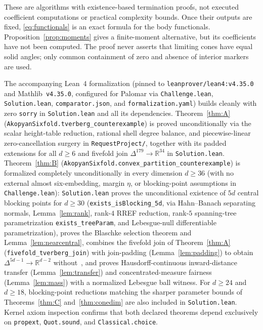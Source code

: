\documentclass[a4paper,11pt,reqno]{amsart}
\newcommand{\R}{\mathbb R}
\theoremstyle{definition}
\theoremstyle{remark}
\numberwithin{equation}{section}
\begin{document}
These are algorithms with existence-based termination proofs, not
executed coefficient computations or practical complexity bounds.
Once their outputs are fixed, \eqref{eq:functionals} is an exact formula
for the body functionals. Proposition~\ref{prop:moments} gives a
finite-moment alternative, but its coefficients have not been computed.
The proof never asserts that limiting cones have equal solid angles;
only common containment of zero and absence of interior markers are used.

\begin{sloppypar}
The accompanying Lean~4 formalization (pinned to \texttt{leanprover/lean4:v4.35.0}
and Mathlib~\texttt{v4.35.0}, configured for Palomar via
\texttt{Challenge.lean}, \texttt{Solution.lean}, \texttt{comparator.json},
and \texttt{formalization.yaml}) builds cleanly with zero \texttt{sorry}
in \texttt{Solution.lean} and all its dependencies.
Theorem~\ref{thm:A} (\texttt{AkopyanSixfold.\allowbreak tverberg\_\allowbreak counterexample})
is proved unconditionally via the scalar height-table reduction, rational shell
degree balance, and piecewise-linear zero-cancellation surgery in
\texttt{RequestProject/}, together with its padded extensions for all $d\ge6$
and fivefold join $\Delta^{179}\to\R^{34}$ in \texttt{Solution.lean}.
Theorem~\ref{thm:B}
(\texttt{AkopyanSixfold.\allowbreak convex\_\allowbreak partition\_\allowbreak counterexample})
is formalized completely unconditionally in every dimension $d\ge36$ (with no
external almost six-embedding, margin $\eta$, or blocking-point assumptions in
\texttt{Challenge.lean}): \texttt{Solution.lean} proves the unconditional
existence of $5d$ central blocking points for $d\ge30$
(\texttt{exists\_isBlocking\_5d}, via Hahn--Banach separating normals,
Lemma~\ref{lem:rank}, rank-$4$ RREF reduction, rank-$5$ spanning-tree
parametrization \texttt{exists\_treeParam}, and Lebesgue-null differentiable
parametrization), proves the Blaschke selection theorem and Lemma~\ref{lem:nearcentral},
combines the fivefold join of Theorem~\ref{thm:A} (\texttt{fivefold\_tverberg\_join})
with join-padding (Lemma~\ref{lem:padding}) to obtain
$\Delta^{5d-1}\to\R^{d-2}$ without~\cite{AKS}, and proves
Hausdorff-continuous inward-distance transfer (Lemma~\ref{lem:transfer}) and
concentrated-measure fairness (Lemma~\ref{lem:mass}) with a normalized
Lebesgue ball witness. For $d\ge24$ and $d\ge18$, blocking-point reductions
matching the sharper parameter bounds of Theorems~\ref{thm:C}
and~\ref{thm:conedim} are also included in \texttt{Solution.lean}.
Kernel axiom inspection confirms that both declared theorems depend exclusively
on \texttt{propext}, \texttt{Quot.sound}, and \texttt{Classical.choice}.
\end{sloppypar}
\end{document}

